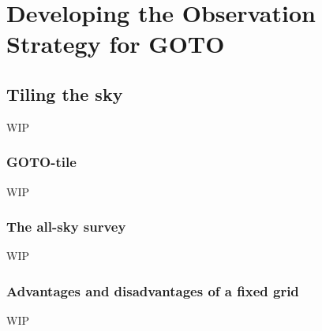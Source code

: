 \chapter{Developing the Observation Strategy for GOTO}
\label{chap:strategy}
\chaptoc{}


\newpage
\section{Tiling the sky}
\label{sec:tiling}
\begin{colsection}


\begin{colsection}

WIP

\end{colsection}


\subsection{GOTO-tile}
\label{sec:gototile}
\begin{colsection}

WIP

\end{colsection}


\subsection{The all-sky survey}
\label{sec:survey}
\begin{colsection}

WIP

\end{colsection}


\subsection{Advantages and disadvantages of a fixed grid}
\label{sec:fixed_grid}
\begin{colsection}

WIP

\end{colsection}


\end{colsection}

